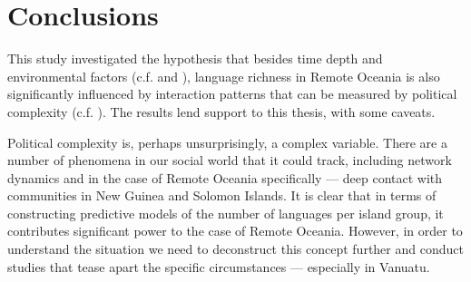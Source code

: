 \documentclass[unnumsec,webpdf,modern,medium]{oup-authoring-template}
\begin{document}
 

\FloatBarrier
\section{Conclusions}
This study investigated the hypothesis that besides time depth and environmental factors (c.f. \citet{curriemace2009, gavin2012island, hua2019ecological} and \citet{Pacheco_Coelho_2019}), language richness in Remote Oceania is also significantly influenced by interaction patterns that can be measured by political complexity (c.f. \citet{pawley81, pawley2007}). The results lend support to this thesis, with some caveats. 

Political complexity is, perhaps unsurprisingly, a complex variable. There are a number of phenomena in our social world that it could track, including network dynamics and in the case of Remote Oceania specifically --- deep contact with communities in New Guinea and Solomon Islands. It is clear that in terms of constructing predictive models of the number of languages per island group, it contributes significant power to the case of Remote Oceania. However, in order to understand the situation we need to deconstruct this concept further and conduct studies that tease apart the specific circumstances --- especially in Vanuatu. 
\end{document}
